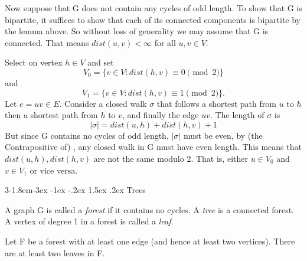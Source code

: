 \documentclass{tufte-handout}
\makeatletter
\renewcommand{\subsection}{\@startsection{subsection}%
    {3}{-1.8em}{-3ex \@plus -1ex \@minus -.2ex}%
    {1.5ex \@plus .2ex}
    {\hspace*{-5.5em}\fcolorbox{ltblue}{ltblue}{\parbox[c][1.0ex][b]{4em}{\phantom{space}}}
    \normalfont\large\itshape\color{ltblue}}}
\makeatother
\begin{document}
Now suppose that G does not contain any cycles of odd length. To show that G is bipartite,
it suffices to show that each of its connected components is bipartite by the lemma above.
So without loss of generality we may assume that G is connected.
That means \(dist(u,v) < \infty\) for all \(u,v \in V\).

Select on vertex \( h\in V   \) and set
\[V_0 = \{v\in V: dist(h,v) \equiv 0 \pmod2\}\]
and
\[V_1 = \{v\in V: dist(h,v) \equiv 1 \pmod2\}.\]
Let \( e = uv \in E \). Consider a closed walk \(\sigma\) that follows a shortest path from \( u \) to \( h \)
then a shortest path from \( h \) to \( v \), and finally the edge \( uv \). The length of \(\sigma\) is
\[ \left|\sigma\right| = dist(u,h) + dist(h,v) + 1 \]
But since G contains no cycles of odd length, \(\left|\sigma\right|\) must be even, by (the Contrapositive of) ,
any closed walk in G must have even length. This means that \( dist(u,h),dist(h,v)\) are not the same modulo 2.
That is, either \(u \in V_0\) and \(v \in V_1\) or vice versa. \qedsymbol

\subsection{Trees}

A graph G is called a \textit{forest} if it contains no cycles. A \textit{tree} is a connected forest.
A vertex of degree 1 in a forest is called a \textit{leaf}.

\begin{Proposition}
    \label{prop:tree_leaves}
    Let F be a forest with at least one edge (and hence at least two vertices). There are at least two leaves in F.
\end{Proposition}
\end{document}
